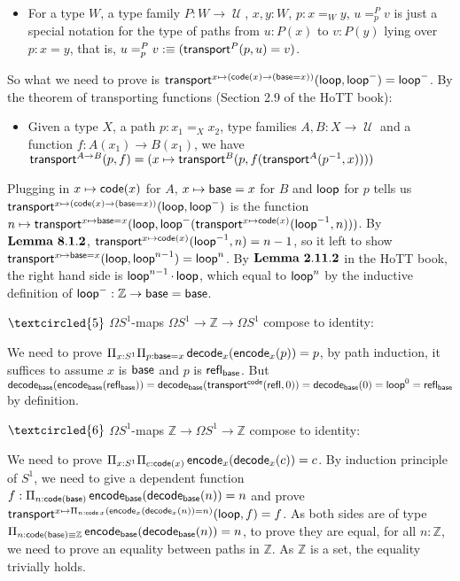 \documentclass[11pt]{article}
\DeclareMathOperator{\cu}{\mathcal U}
\DeclareMathOperator{\base}{\sf base}
\DeclareMathOperator{\lp}{\sf loop}
\DeclareMathOperator{\code}{\sf code}
\DeclareMathOperator{\encode}{\sf encode}
\DeclareMathOperator{\decode}{\sf decode}
\DeclareMathOperator{\transport}{\sf transport}
\DeclareMathOperator{\rfl}{\sf refl}
\theoremstyle{definition}
\begin{document}
\begin{itemize}
\item For a type $W$, a type family $P:W\to \cu$, $x,y:W$, $p:x=_Wy$, $u=_p^Pv$ is just a special notation for the type of paths from $u:P(x)$ to $v:P(y)$ lying over $p:x=y$, that is, $u=_p^Pv:\equiv (\transport^P(p,u)=v)$.
\end{itemize}

So what we need to prove is $\transport^{x\mapsto (\code(x)\to (\base = x))}(\lp,\lp^-)=\lp^-$. By the theorem of transporting functions (Section 2.9 of the HoTT book):
\begin{itemize}
\item Given a type $X$, a path $p:x_1=_Xx_2$, type families $A,B:X\to \cu$ and a function $f:A(x_1)\to B(x_1)$, we have $\transport^{A\to B}(p,f)=(x\mapsto \transport^B(p,f(\transport^A(p^{-1},x))))$
\end{itemize}

Plugging in $x\mapsto \code (x)$ for $A$, $x\mapsto \base = x$ for $B$ and $\lp$ for $p$ tells us $\transport^{x\mapsto (\code(x)\to (\base = x))}(\lp,\lp^-)$ is the function $n\mapsto \transport^{x\mapsto \base = x}(\lp,\lp^-(\transport^{x\mapsto \code(x)}(\lp^{-1},n)))$. By $\bf Lemma \ 8.1.2$, $\transport^{x\mapsto \code(x)}(\lp^{-1},n) = n-1$, so it left to show $\transport^{x\mapsto \base = x}(\lp,\lp^{n-1})=\lp^n$. By $\bf Lemma \ 2.11.2$ in the HoTT book, the right hand side is $\lp^{n-1}\cdot \lp$, which equal to $\lp^n$ by the inductive definition of $\lp^-:\mathbb Z\to \base = \base$.

$\textcircled{5}$ $\Omega S^1$-maps $\Omega S^1\to \mathbb Z\to \Omega S^1$ compose to identity:

We need to prove $\Pi_{x:S^1}\Pi_{p:\base = x}\decode_x(\encode_x(p))=p$, by path induction, it suffices to assume $x$ is $\base$ and $p$ is $\rfl_{\base}$. But $\decode_{\base}(\encode_{\base}(\rfl_{\base}))=\decode_{\base}(\transport^{\code}(\rfl,0))=\decode_{\base}(0)=\lp^0=\rfl_{\base}$ by definition.

$\textcircled{6}$ $\Omega S^1$-maps $\mathbb Z\to \Omega S^1\to \mathbb Z$ compose to identity:

We need to prove $\Pi_{x:S^1} \Pi_{c:\code (x)}\encode_x(\decode_x(c))=c$. By induction principle of $S^1$, we need to give a dependent function $f:\Pi_{n:\code(\base)}\encode_{\base}(\decode_{\base}(n))=n$ and prove \newline $\transport^{x\mapsto \Pi_{n:\code x}(\encode_x(\decode_x(n))=n)}(\lp,f)=f$. As both sides are of type $\Pi_{n:\code (\base)\equiv \mathbb Z}\encode_{\base}(\decode_{\base}(n))=n$, to prove they are equal, for all $n:\mathbb Z$, we need to prove an equality between paths in $\mathbb Z$. As $\mathbb Z$ is a set, the equality trivially holds.
\end{document}
